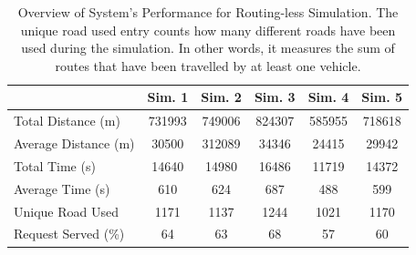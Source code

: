 \begin{table}[h]
	\centering
	\begin{tabular}{ |p{3.7cm}|c|c|c|c|c|}
		& Sim. 1 & Sim. 2 & Sim. 3 & Sim. 4 & Sim. 5 \\
		\hline
		Total Distance (m)     &731993& 749006   & 824307 & 585955& 718618 \\
		Average Distance (m)  &30500 & 312089  & 34346 & 24415& 29942\\
		Total Time (s)         &14640& 14980  & 16486 & 11719& 14372\\
		Average Time (s)      & 610& 624   & 687 & 488& 599\\
		Unique Road Used 				&1171&1137&1244&1021& 1170\\
		Request Served  (\%)&64 & 63   & 68 & 57&60 \\
	\end{tabular}
	
	\caption[Overview of System's Performance for Routing-less Simulation.]{Overview of System's Performance for Routing-less Simulation. The unique road used entry counts how many different roads have been used during the simulation. In other words, it measures the sum of routes that have been travelled by at least one vehicle. }
	\label{tab:routingless_simu_performance}   
\end{table}
